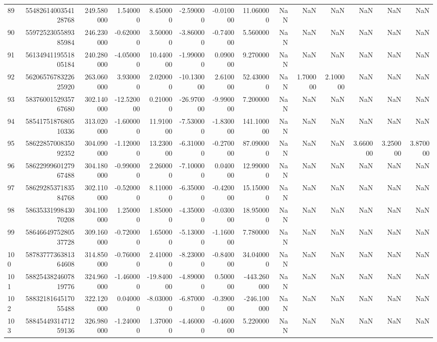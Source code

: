 \begin{tabular}{lrrrrrrrrrrrrr}
89 & 5548261400354128768 & 249.580000 & 1.540000 & 8.450000 & -2.590000 & -0.010000 & 11.060000 & NaN & NaN & NaN & NaN & NaN & NaN \\
90 & 5597252305589385984 & 246.230000 & -0.620000 & 3.500000 & -3.860000 & -0.740000 & 5.560000 & NaN & NaN & NaN & NaN & NaN & NaN \\
91 & 5613494119551805184 & 240.280000 & -4.050000 & 10.440000 & -1.990000 & 0.090000 & 9.270000 & NaN & NaN & NaN & NaN & NaN & NaN \\
92 & 5620657678322625920 & 263.060000 & 3.930000 & 2.020000 & -10.130000 & 2.610000 & 52.430000 & NaN & 1.700000 & 2.100000 & NaN & NaN & NaN \\
93 & 5837600152935767680 & 302.140000 & -12.520000 & 0.210000 & -26.970000 & -9.990000 & 7.200000 & NaN & NaN & NaN & NaN & NaN & NaN \\
94 & 5854175187680510336 & 313.020000 & -1.600000 & 11.910000 & -7.530000 & -1.830000 & 141.100000 & NaN & NaN & NaN & NaN & NaN & NaN \\
95 & 5862285700835092352 & 304.090000 & -1.120000 & 13.230000 & -6.310000 & -0.270000 & 87.090000 & NaN & NaN & NaN & 3.660000 & 3.250000 & 3.870000 \\
96 & 5862299960127967488 & 304.180000 & -0.990000 & 2.260000 & -7.100000 & 0.040000 & 12.990000 & NaN & NaN & NaN & NaN & NaN & NaN \\
97 & 5862928537183584768 & 302.110000 & -0.520000 & 8.110000 & -6.350000 & -0.420000 & 15.150000 & NaN & NaN & NaN & NaN & NaN & NaN \\
98 & 5863533199843070208 & 304.100000 & 1.250000 & 1.850000 & -4.350000 & -0.030000 & 18.950000 & NaN & NaN & NaN & NaN & NaN & NaN \\
99 & 5864664975280537728 & 309.160000 & -0.720000 & 1.650000 & -5.130000 & -1.160000 & 7.780000 & NaN & NaN & NaN & NaN & NaN & NaN \\
100 & 5878377736381364608 & 314.850000 & -0.760000 & 2.410000 & -8.230000 & -0.840000 & 34.040000 & NaN & NaN & NaN & NaN & NaN & NaN \\
101 & 5882543824607819776 & 324.960000 & -1.460000 & -19.840000 & -4.890000 & 0.500000 & -443.260000 & NaN & NaN & NaN & NaN & NaN & NaN \\
102 & 5883218164517055488 & 322.120000 & 0.040000 & -8.030000 & -6.870000 & -0.390000 & -246.100000 & NaN & NaN & NaN & NaN & NaN & NaN \\
103 & 5884544931471259136 & 326.980000 & -1.240000 & 1.370000 & -4.460000 & -0.460000 & 5.220000 & NaN & NaN & NaN & NaN & NaN & NaN \\

\end{tabular}
